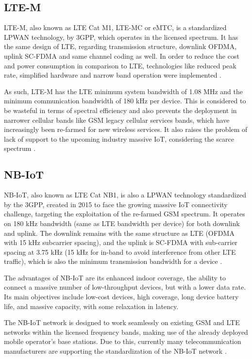 \subsection{LTE-M}

LTE-M, also known as \ac{LTE} Cat M1, \ac{LTE-MC} or \ac{eMTC}, is a standardized LPWAN technology, by 3GPP, which operates in the licensed spectrum. It has the same design of LTE, regarding transmission structure, downlink \ac{OFDMA}, uplink \ac{SC-FDMA} and same channel coding as well. In order to reduce the cost and power consumption in comparison to LTE, technologies like reduced peak rate, simplified hardware and narrow band operation were implemented \cite{Yang2017}.

As such, LTE-M has the LTE minimum system bandwidth of 1.08 MHz and the minimum communication bandwidth of 180 kHz per device. This is considered to be wasteful in terms of spectral efficiency and also prevents the deployment in narrower cellular bands like GSM legacy cellular services bands, which have increasingly been re-farmed for new wireless services. It also raises the problem of lack of support to the upcoming industry massive IoT, considering the scarce spectrum \cite{Yang2017}.

\subsection{NB-IoT}

NB-IoT, also known as LTE Cat NB1, is also a LPWAN technology standardized by the 3GPP, created in 2015 to face the growing massive IoT connectivity challenge, targeting the exploitation of the re-farmed GSM spectrum. It operates on 180 kHz bandwidth (same as LTE bandwidth per device) for both downlink and uplink. The downlink remains with the same structure as LTE (OFDMA with 15 kHz
subcarrier spacing), and the uplink is SC-FDMA with sub-carrier spacing at 3.75 kHz (15 kHz for in-band to avoid interference from other LTE traffic), which is also the minimum transmission bandwidth for a device \cite{Ratasuk2016}.

The advantages of NB-IoT are its enhanced indoor coverage, the ability to connect a massive number of low-throughput devices, but with a lower data rate. Its main objectives include low-cost devices, high coverage, long device battery life, and massive capacity, with some relaxation in latency.

The NB-IoT network is designed to work seamlessly on existing GSM and LTE networks within the licensed frequency bands, making use of the already deployed mobile operator’s base stations. Due to this, currently many telecommunication manufacturers are supporting the standardization of the NB-IoT network \cite{Song2017}.

